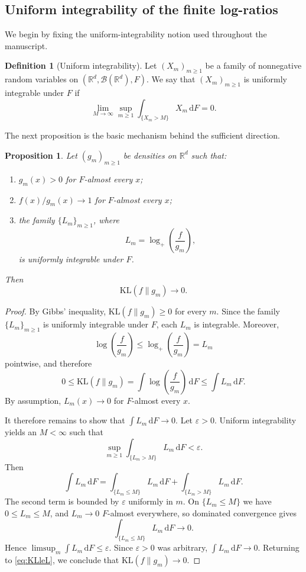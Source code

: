 \documentclass[11pt]{article}
\newtheorem{proposition}[theorem]{Proposition}
\theoremstyle{definition}
\newtheorem{definition}[theorem]{Definition}
\begin{document}
\subsection{Uniform integrability of the finite log-ratios}

We begin by fixing the uniform-integrability notion used throughout the manuscript.

\begin{definition}[Uniform integrability]
Let $(X_m)_{m\ge1}$ be a family of nonnegative random variables on $(\mathbb{R}^d,\mathcal B(\mathbb{R}^d),F)$. We say that $(X_m)_{m\ge1}$ is uniformly integrable under $F$ if
\[
\lim_{M\to\infty}\sup_{m\ge1}\int_{\{X_m>M\}} X_m\,\mathrm{d}F =0.
\]
\end{definition}

The next proposition is the basic mechanism behind the sufficient direction.

\begin{proposition}
\label{prop:UIKL}
Let $(g_m)_{m\ge1}$ be densities on $\mathbb{R}^d$ such that:
\begin{enumerate}[label=\textnormal{(\roman*)}]
    \item $g_m(x)>0$ for $F$-almost every $x$;
    \item $f(x)/g_m(x)\to1$ for $F$-almost every $x$;
    \item the family $\{L_m\}_{m\ge1}$, where
    \[
    L_m=\log_+\!\left(\frac{f}{g_m}\right),
    \]
    is uniformly integrable under $F$.
\end{enumerate}
Then
\[
\mathrm{KL}(f\|g_m)\to0.
\]
\end{proposition}

\begin{proof}
By Gibbs' inequality, $\mathrm{KL}(f\|g_m)\ge0$ for every $m$. Since the family $\{L_m\}_{m\ge1}$ is uniformly integrable under $F$, each $L_m$ is integrable. Moreover,
\[
\log\!\left(\frac{f}{g_m}\right)\le \log_+\!\left(\frac{f}{g_m}\right)=L_m
\]
pointwise, and therefore
\begin{equation}
\label{eq:KLleL}
0\le \mathrm{KL}(f\|g_m)
=\int \log\!\left(\frac{f}{g_m}\right)\,\mathrm{d}F
\le \int L_m\,\mathrm{d}F.
\end{equation}
By assumption, $L_m(x)\to0$ for $F$-almost every $x$.

It therefore remains to show that $\int L_m\,\mathrm{d}F\to0$. Let $\varepsilon>0$. Uniform integrability yields an $M<\infty$ such that
\[
\sup_{m\ge1}\int_{\{L_m>M\}}L_m\,\mathrm{d}F<\varepsilon.
\]
Then
\[
\int L_m\,\mathrm{d}F
=\int_{\{L_m\le M\}}L_m\,\mathrm{d}F+\int_{\{L_m>M\}}L_m\,\mathrm{d}F.
\]
The second term is bounded by $\varepsilon$ uniformly in $m$. On $\{L_m\le M\}$ we have $0\le L_m\le M$, and $L_m\to0$ $F$-almost everywhere, so dominated convergence gives
\[
\int_{\{L_m\le M\}}L_m\,\mathrm{d}F\to0.
\]
Hence $\limsup_m\int L_m\,\mathrm{d}F\le\varepsilon$. Since $\varepsilon>0$ was arbitrary, $\int L_m\,\mathrm{d}F\to0$. Returning to \eqref{eq:KLleL}, we conclude that $\mathrm{KL}(f\|g_m)\to0$.
\end{proof}
\end{document}
